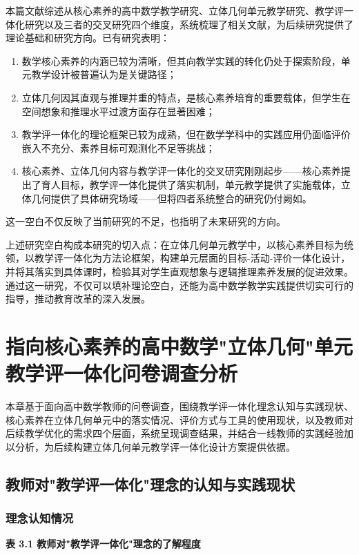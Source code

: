\documentclass[UTF8,a4paper,12pt,twoside]{ctexart}
\begin{document}
本篇文献综述从核心素养的高中数学教学研究、立体几何单元教学研究、教学评一体化研究以及三者的交叉研究四个维度，系统梳理了相关文献，为后续研究提供了理论基础和研究方向。已有研究表明：
\begin{enumerate}
\item 数学核心素养的内涵已较为清晰，但其向教学实践的转化仍处于探索阶段，单元教学设计被普遍认为是关键路径；
\item 立体几何因其直观与推理并重的特点，是核心素养培育的重要载体，但学生在空间想象和推理水平过渡方面存在显著困难；
\item 教学评一体化的理论框架已较为成熟，但在数学学科中的实践应用仍面临评价嵌入不充分、素养目标可观测化不足等挑战；
\item 核心素养、立体几何内容与教学评一体化的交叉研究刚刚起步——核心素养提出了育人目标，教学评一体化提供了落实机制，单元教学提供了实施载体，立体几何提供了具体研究场域——但将四者系统整合的研究仍付阙如。
\end{enumerate}
这一空白不仅反映了当前研究的不足，也指明了未来研究的方向。

上述研究空白构成本研究的切入点：在立体几何单元教学中，以核心素养目标为统领，以教学评一体化为方法论框架，构建单元层面的目标-活动-评价一体化设计，并将其落实到具体课时，检验其对学生直观想象与逻辑推理素养发展的促进效果。通过这一研究，不仅可以填补理论空白，还能为高中数学教学实践提供切实可行的指导，推动教育改革的深入发展。

\section{指向核心素养的高中数学"立体几何"单元教学评一体化问卷调查分析}

本章基于面向高中数学教师的问卷调查，围绕教学评一体化理念认知与实践现状、核心素养在立体几何单元中的落实情况、评价方式与工具的使用现状，以及教师对后续教学优化的需求四个层面，系统呈现调查结果，并结合一线教师的实践经验加以分析，为后续构建立体几何单元教学评一体化设计方案提供依据。

\subsection{教师对"教学评一体化"理念的认知与实践现状}

\subsubsection{理念认知情况}

\textbf{表 3.1 教师对"教学评一体化"理念的了解程度}
\end{document}
